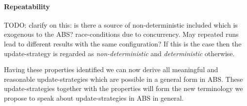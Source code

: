 \paragraph{Repeatability}
TODO: clarify on this: is there a source of non-deterministic included which is exogenous to the ABS? race-conditions due to concurrency.
May repeated runs lead to different results with the same configuration? If this is the case then the update-strategy is regarded as \textit{non-deterministic} and \textit{deterministic} otherwise.

\medskip

Having these properties identified we can now derive all meaningful and reasonable update-strategies which are possible in a general form in ABS. These update-strategies together with the properties will form the new terminology we propose to speak about update-strategies in ABS in general.